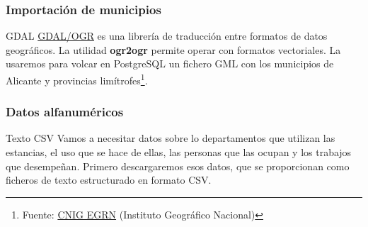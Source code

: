 \documentclass{classes/beamer_GeomaticaUA}
\begin{document}
\begin{frame}[fragile]
\frametitle{Importación de municipios}

\begin{block}{GDAL}
\href{http://www.gdal.org/}{GDAL/OGR} es una librería de traducción entre formatos de datos geográficos. La utilidad \textbf{ogr2ogr} permite operar con formatos vectoriales. La usaremos para volcar en PostgreSQL un fichero GML con los municipios de Alicante y provincias limítrofes\footnote[frame]{Fuente: \href{http://centrodedescargas.cnig.es/CentroDescargas/}{CNIG EGRN} (Instituto Geográfico Nacional)}.
\end{block}



\end{frame}

\begin{frame}[fragile]
\frametitle{Datos alfanuméricos}

\begin{block}{Texto CSV}
Vamos a necesitar datos sobre lo departamentos que utilizan las estancias, el uso que se hace de ellas, las personas que las ocupan y los trabajos que desempeñan. Primero descargaremos esos datos, que se proporcionan como ficheros de texto estructurado en formato CSV.
\end{block}



\end{frame}

\end{document}
